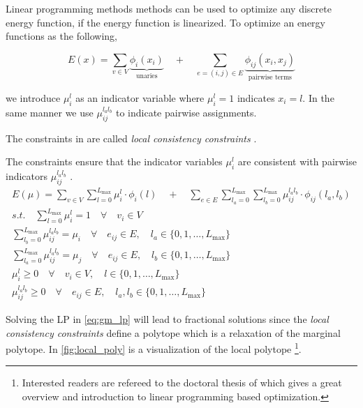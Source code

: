 Linear  programming methods methods can be used to optimize 
any discrete energy function, if the energy function is 
linearized.
To optimize an energy functions as the following,

\begin{equation} \label{eq:gm_nl_energy}
    E(x) = 
     \sum_{v \in V}
    \underbrace{
        \phi_i(x_i)
    }_{\text{unaries}}
     \quad +  \quad
     \sum_{e=(i,j) \in E } 
    \underbrace{
        \phi_{ij}(x_i,x_j) 
    }_{\text{pairwise terms}}
\end{equation}

we introduce $\mu_{i}^{l}$ as an indicator variable where $\mu_{i}^{l}=1$ indicates $x_i=l$.
In the same manner we use $\mu_{ij}^{l_a l_b}$ to indicate pairwise 
assignments.

The  constraints in  are
called \emph{local consistency constraints} \citep{sontag_2010_thesis}.

The constraints ensure that the indicator variables $\mu_{i}^{l}$ are consistent 
with pairwise indicators $\mu_{ij}^{l_a l_b}$ .
\begin{align}
    E(\mu) = \sum_{v \in V} \sum_{l=0}^{L_{\text{max}}} \label{eq:gm_lp}
    \mu_{i}^{l} \cdot \phi_{i}( l)
    \quad +  \quad
    \sum_{e \in E} \sum_{l_a=0}^{L_{\text{max}}} \sum_{l_b=0}^{L_{\text{max}}}
    \mu_{ij}^{l_a l_b} \cdot \phi_{ij}( l_a,l_b) \\
    s.t. \quad  \label{eq:gm_lp_s}
    \sum_{l=0}^{L_{\text{max}}} \mu_{i}^{l} = 1 \quad \forall \quad v_i \in V \\
    \sum_{l_b=0}^{L_{\text{max}}} \mu_{ij}^{l_a l_b} = \mu_i 
    \quad \forall \quad e_{ij} \in E, 
    \quad l_a \in \{ 0,1,\ldots,L_{\text{max}} \} \\ 
    \sum_{l_a=0}^{L_{\text{max}}} \mu_{ij}^{l_a l_b} = \mu_j 
    \quad \forall \quad e_{ij} \in E, 
    \quad l_b \in \{ 0,1,\ldots,L_{\text{max}} \} \\ 
    \mu_i^l \geq 0 \quad \forall \quad v_{i} \in V,
    \quad l \in \{ 0,1,\ldots,L_{\text{max}} \}\\
    \mu_{ij}^{l_a l_b} \geq 0 \quad \forall \quad e_{ij} \in E,
    \quad l_a,l_b \in \{ 0,1,\ldots,L_{\text{max}} \} \label{eq:gm_lp_e}
\end{align}

Solving the LP in \cref{eq:gm_lp} will lead to fractional
solutions since the \emph{local consistency constraints} 
define a polytope which is a relaxation
of the marginal polytope.
In \cref{fig:local_poly} is a visualization of the local
polytope \footnote{
Interested readers are refereed to the doctoral
thesis of  \citet{sontag_2010_thesis} which gives
a great overview and introduction to linear programming
based optimization.
}.


